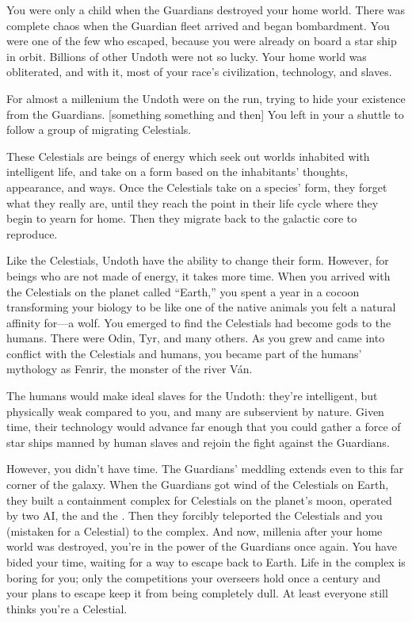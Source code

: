 \documentclass[char]{guardians}
\begin{document}

You were only a child when the Guardians destroyed your home world. There was complete chaos when the Guardian fleet arrived and began bombardment. You were one of the few who escaped, because you were already on board a star ship in orbit. Billions of other Undoth were not so lucky. Your home world was obliterated, and with it, most of your race's civilization, technology, and slaves.

For almost a millenium the Undoth were on the run, trying to hide your existence from the Guardians. [something something and then]
You left in your a shuttle to follow a group of migrating Celestials.

These Celestials are beings of energy which seek out worlds inhabited with intelligent life, and take on a form based on the inhabitants' thoughts, appearance, and ways. Once the Celestials take on a species' form, they forget what they really are, until they reach the point in their life cycle where they begin to yearn for home. Then they migrate back to the galactic core to reproduce.

Like the Celestials, Undoth have the ability to change their form. However, for beings who are not made of energy, it takes more time. When you arrived with the Celestials on the planet called ``Earth,'' you spent a year in a cocoon transforming your biology to be like one of the native animals you felt a natural affinity for---a wolf. You emerged to find the Celestials had become gods to the humans. There were Odin, Tyr, and many others. As you grew and came into conflict with the Celestials and humans, you became part of the humans' mythology as Fenrir, the monster of the river V\'an.

The humans would make ideal slaves for the Undoth: they're intelligent, but physically weak compared to you, and many are subservient by nature. Given time, their technology would advance far enough that you could gather a force of star ships manned by human slaves and rejoin the fight against the Guardians.

However, you didn't have time. The Guardians' meddling extends even to this far corner of the galaxy. When the Guardians got wind of the Celestials on Earth, they built a containment complex for Celestials on the planet's moon, operated by two AI, the \cWarden{} and the \cCaretaker{}. Then they forcibly teleported the Celestials and you (mistaken for a Celestial) to the complex. And now, millenia after your home world was destroyed, you're in the power of the Guardians once again. You have bided your time, waiting for a way to escape back to Earth. Life in the complex is boring for you; only the competitions your overseers hold once a century and your plans to escape keep it from being completely dull. At least everyone still thinks you're a Celestial.
\end{document}
